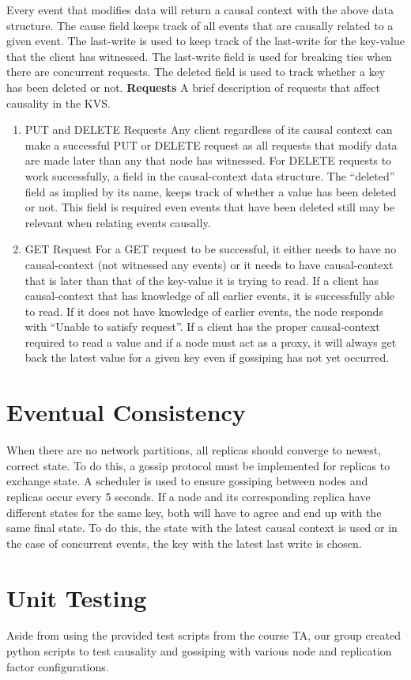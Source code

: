\documentclass[12pt]{article}
\begin{document}
Every event that modifies data will return a causal context with the above data structure. The cause field keeps track of all events that are causally related to a given event. The last-write is used to keep track of the last-write for the key-value that the client has witnessed. The last-write field is used for breaking ties when there are concurrent requests. The deleted field is used to track whether a key has been deleted or not.
\newline
\newline
\textbf{Requests}
\newline
A brief description of requests that affect causality in the KVS.
\begin{enumerate}
\item{PUT and DELETE Requests}
\newline
Any client regardless of its causal context can make a successful PUT or DELETE request as all requests that modify data are made later than any that node has witnessed.  For DELETE requests to work successfully, a field in the causal-context data structure. The “deleted” field as implied by its name, keeps track of whether a value has been deleted or not. This field is required even events that have been deleted still may be relevant when relating events causally. 

\item{GET Request}
\newline
For a GET request to be successful, it either needs to have no causal-context (not witnessed any events) or it needs to have causal-context that is later than that of the key-value it is trying to read. If a client has causal-context that has knowledge of all earlier events, it is successfully able to read. If it does not have knowledge of earlier events, the node responds with “Unable to satisfy request”. If a client has the proper causal-context required to read a value and if a node must act as a proxy, it will always get back the latest value for a given key even if gossiping has not yet occurred.
\end{enumerate}
\section{Eventual Consistency}
When there are no network partitions, all replicas should converge to newest, correct state. To do this, a gossip protocol must be implemented for replicas to exchange state. A scheduler is used to ensure gossiping between nodes and replicas occur every 5 seconds. If a node and its corresponding replica have different states for the same key, both will have to agree and end up with the same final state. To do this, the state with the latest causal context is used or in the case of concurrent events, the key with the latest last write is chosen.
\section{Unit Testing}
Aside from using the provided test scripts from the course TA, our group created  python scripts to test causality and gossiping with various node and replication factor configurations. 
\end{document}
